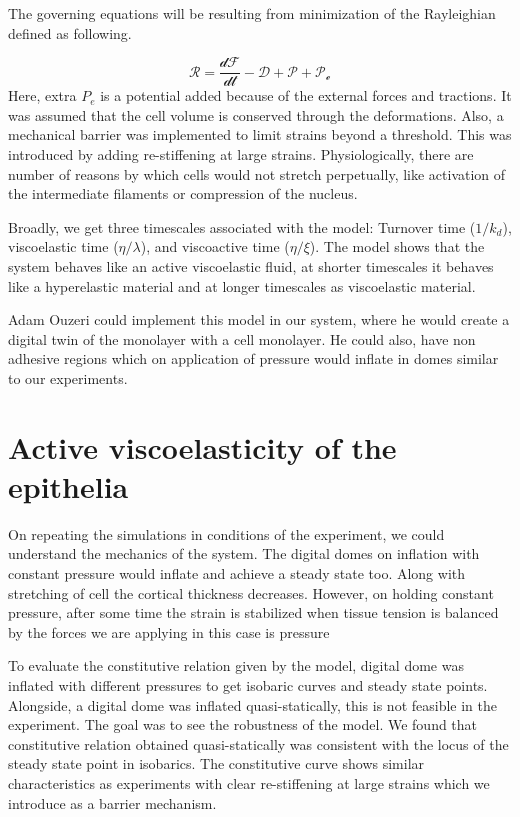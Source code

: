 The governing equations will be resulting from minimization of the
Rayleighian defined as following.

\[ \mathcal{R = \frac{dF}{dt} - D + P + P_e}\] Here, extra \(P_e\) is a
potential added because of the external forces and tractions. It was
assumed that the cell volume is conserved through the deformations.
Also, a mechanical barrier was implemented to limit strains beyond a
threshold. This was introduced by adding re-stiffening at large strains.
Physiologically, there are number of reasons by which cells would not
stretch perpetually, like activation of the intermediate filaments or
compression of the nucleus.

Broadly, we get three timescales associated with the model: Turnover
time (\(1/k_d\)), viscoelastic time (\(\eta / \lambda\)), and
viscoactive time (\(\eta / \xi\)). The model shows that the system
behaves like an active viscoelastic fluid, at shorter timescales it
behaves like a hyperelastic material and at longer timescales as
viscoelastic material.

Adam Ouzeri could implement this model in our system, where he would
create a digital twin of the monolayer with a cell monolayer. He could
also, have non adhesive regions which on application of pressure would
inflate in domes similar to our experiments.

\hypertarget{active-viscoelasticity-of-the-epithelia}{%
\section{Active viscoelasticity of the
epithelia}\label{active-viscoelasticity-of-the-epithelia}}

On repeating the simulations in conditions of the experiment, we could
understand the mechanics of the system. The digital domes on inflation
with constant pressure would inflate and achieve a steady state too.
Along with stretching of cell the cortical thickness decreases. However,
on holding constant pressure, after some time the strain is stabilized
when tissue tension is balanced by the forces we are applying in this
case is pressure

To evaluate the constitutive relation given by the model, digital dome
was inflated with different pressures to get isobaric curves and steady
state points. Alongside, a digital dome was inflated quasi-statically,
this is not feasible in the experiment. The goal was to see the
robustness of the model. We found that constitutive relation obtained
quasi-statically was consistent with the locus of the steady state point
in isobarics. The constitutive curve shows similar characteristics as
experiments with clear re-stiffening at large strains which we introduce
as a barrier mechanism.

